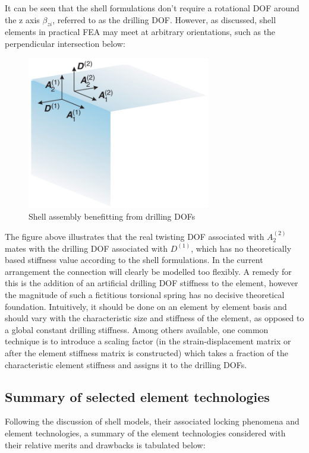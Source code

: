 It can be seen that the shell formulations don't require a rotational DOF around the z axis $\beta_{zi}$, referred to as the drilling DOF. However, as discussed, shell elements in practical FEA may meet at arbitrary orientations, such as the perpendicular intersection below:

\begin{figure}[H]
	\centering
	\def\svgwidth{\columnwidth}
	\includegraphics[width=8cm]{images/drillingDOF.png}
	\caption{Shell assembly benefitting from drilling DOFs \cite{BischLitBook04}}
	\label{shellModels}
\end{figure}

The figure above illustrates that the real twisting DOF associated with $A_2^{(2)}$ mates with the drilling DOF associated with $D^{(1)}$, which has no theoretically based stiffness value according to the shell formulations. In the current arrangement the connection will clearly be modelled too flexibly.  A remedy for this is the addition of an artificial drilling DOF stiffness to the element, however the magnitude of such a fictitious torsional spring has no decisive theoretical foundation. Intuitively, it should be done on an element by element basis and should vary with the characteristic size and stiffness of the element, as opposed to a global constant drilling stiffness. Among others available, one common technique is to introduce a scaling factor (in the strain-displacement matrix or after the element stiffness matrix is constructed) which takes a fraction of the characteristic element stiffness and assigns it to the drilling DOFs. 

\subsection{Summary of selected element technologies}

Following the discussion of shell models, their associated locking phenomena and element technologies, a summary of the element technologies considered with their relative merits and drawbacks is tabulated below:

